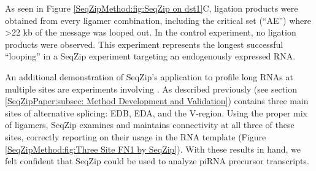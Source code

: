     As seen in Figure \ref{SeqZipMethod:fig:SeqZip on dst1}C, ligation products were obtained from every ligamer combination, including the critical set (``AE'') where >22 kb of the message was looped out. In the control experiment, no ligation products were observed. This experiment represents the longest successful ``looping'' in a SeqZip experiment targeting an endogenously expressed RNA.

    An additional demonstration of SeqZip's application to profile long RNAs at multiple sites are experiments involving \fn{}. As described previously (see section \ref{SeqZipPaper:subsec: Method Development and Validation}) \fn{} contains three main sites of alternative splicing: EDB, EDA, and the V-region. Using the proper mix of ligamers, SeqZip examines and maintains connectivity at all three of these sites, correctly reporting on their usage in the RNA template (Figure \ref{SeqZipMethod:fig:Three Site FN1 by SeqZip}). With these results in hand, we felt confident that SeqZip could be used to analyze piRNA precursor transcripts.

